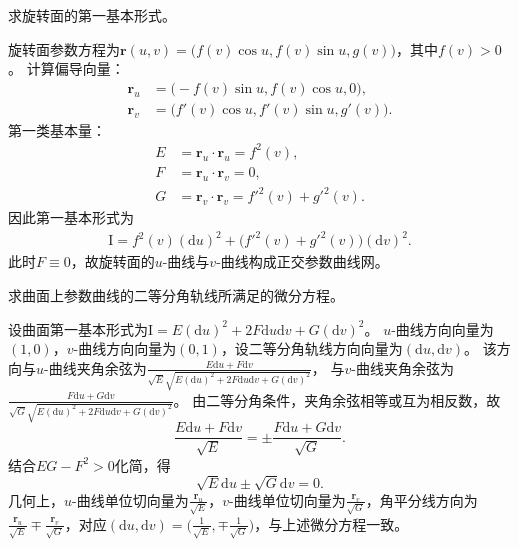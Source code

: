 \documentclass[../../main.tex]{subfiles}%
\begin{document}
\begin{example}
求旋转面的第一基本形式。
\end{example}
\begin{solution}
旋转面参数方程为$\boldsymbol{r}(u,v)=\big(f(v)\cos u,f(v)\sin u,g(v)\big)$，其中$f(v)>0$。
计算偏导向量：
\begin{align*}
\boldsymbol{r}_u&=\big(-f(v)\sin u,f(v)\cos u,0\big),\\
\boldsymbol{r}_v&=\big(f'(v)\cos u,f'(v)\sin u,g'(v)\big).
\end{align*}
第一类基本量：
\begin{align*}
E&=\boldsymbol{r}_u\cdot\boldsymbol{r}_u=f^2(v),\\
F&=\boldsymbol{r}_u\cdot\boldsymbol{r}_v=0,\\
G&=\boldsymbol{r}_v\cdot\boldsymbol{r}_v=f'^2(v)+g'^2(v).
\end{align*}
因此第一基本形式为
\begin{align*}
\mathrm{I}=f^2(v)(\mathrm{d}u)^2+\big(f'^2(v)+g'^2(v)\big)(\mathrm{d}v)^2.
\end{align*}
此时$F\equiv0$，故旋转面的$u$-曲线与$v$-曲线构成正交参数曲线网。

\end{solution}


\begin{example}
求曲面上参数曲线的二等分角轨线所满足的微分方程。
\end{example}
\begin{solution}
设曲面第一基本形式为$\mathrm{I}=E(\mathrm{d}u)^2+2F\mathrm{d}u\mathrm{d}v+G(\mathrm{d}v)^2$。
$u$-曲线方向向量为$(1,0)$，$v$-曲线方向向量为$(0,1)$，设二等分角轨线方向向量为$(\mathrm{d}u,\mathrm{d}v)$。
该方向与$u$-曲线夹角余弦为$\frac{E\mathrm{d}u+F\mathrm{d}v}{\sqrt{E}\sqrt{E(\mathrm{d}u)^2+2F\mathrm{d}u\mathrm{d}v+G(\mathrm{d}v)^2}}$，
与$v$-曲线夹角余弦为$\frac{F\mathrm{d}u+G\mathrm{d}v}{\sqrt{G}\sqrt{E(\mathrm{d}u)^2+2F\mathrm{d}u\mathrm{d}v+G(\mathrm{d}v)^2}}$。
由二等分角条件，夹角余弦相等或互为相反数，故
\[
\frac{E\mathrm{d}u+F\mathrm{d}v}{\sqrt{E}}=\pm\frac{F\mathrm{d}u+G\mathrm{d}v}{\sqrt{G}}.
\]
结合$EG-F^2>0$化简，得
\[
\sqrt{E}\mathrm{d}u\pm\sqrt{G}\mathrm{d}v=0.
\]
几何上，$u$-曲线单位切向量为$\frac{\boldsymbol{r}_u}{\sqrt{E}}$，$v$-曲线单位切向量为$\frac{\boldsymbol{r}_v}{\sqrt{G}}$，角平分线方向为$\frac{\boldsymbol{r}_u}{\sqrt{E}}\mp\frac{\boldsymbol{r}_v}{\sqrt{G}}$，对应$(\mathrm{d}u,\mathrm{d}v)=\big(\frac{1}{\sqrt{E}},\mp\frac{1}{\sqrt{G}}\big)$，与上述微分方程一致。

\end{solution}
\end{document}
